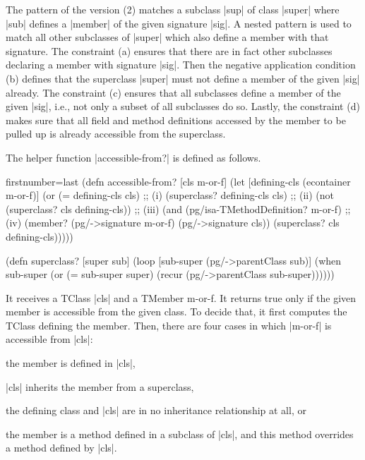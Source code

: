 \documentclass[submission]{eptcs}
\newcommand{\code}{\clojureinline}
\begin{document}
The pattern of the version (2) matches a subclass \code|sup| of class
\code|super| where \code|sub| defines a \code|member| of the given signature
\code|sig|.  A nested pattern is used to match all other subclasses of
\code|super| which also define a member with that signature.  The constraint
(a) ensures that there are in fact other subclasses declaring a member with
signature \code|sig|.  Then the negative application condition (b) defines that
the superclass \code|super| must not define a member of the given \code|sig|
already.  The constraint (c) ensures that all subclasses define a member of the
given \code|sig|, i.e., not only a subset of all subclasses do so.  Lastly, the
constraint (d) makes sure that all field and method definitions accessed by the
member to be pulled up is already accessible from the superclass.

The helper function \code|accessible-from?| is defined as follows.

\begin{clojurecode*}{firstnumber=last}
(defn accessible-from? [cls m-or-f]
  (let [defining-cls (econtainer m-or-f)]
    (or (= defining-cls cls)                    ;; (i)
        (superclass? defining-cls cls)          ;; (ii)
        (not (superclass? cls defining-cls))    ;; (iii)
        (and (pg/isa-TMethodDefinition? m-or-f) ;; (iv)
             (member? (pg/->signature m-or-f)
                      (pg/->signature cls))
             (superclass? cls defining-cls)))))

(defn superclass? [super sub]
  (loop [sub-super (pg/->parentClass sub)]
    (when sub-super
      (or (= sub-super super)
          (recur (pg/->parentClass sub-super))))))
\end{clojurecode*}

It receives a \textsf{TClass} \code|cls| and a \textsf{TMember}
\textsf{m-or-f}.  It returns true only if the given member is accessible from
the given class.  To decide that, it first computes the \textsf{TClass}
defining the member.  Then, there are four cases in which \code|m-or-f| is
accessible from \code|cls|:
\begin{inparaenum}[(i)]
\item the member is defined in \code|cls|,
\item \code|cls| inherits the member from a superclass,
\item the defining class and \code|cls| are in no inheritance relationship at
  all, or
\item the member is a method defined in a subclass of \code|cls|, and this
  method overrides a method defined by \code|cls|.
\end{inparaenum}
\end{document}
